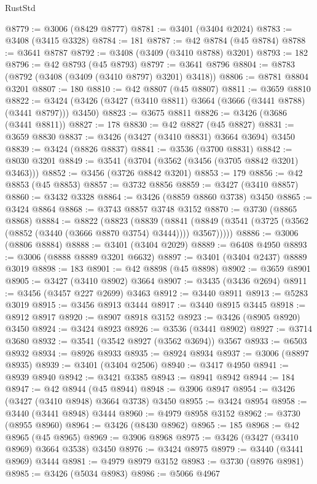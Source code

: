 \begin{lexlean}{RustStd}
\begin{coremodule}
@8779 := @3006 (@8429 @8777)
@8781 := @3401 (@3404 @2024)
@8783 := @3408 (@3415 @3328)
@8784 := 181
@8787 := @42 @8784 (@45 @8784)
@8788 := @3641 @8787
@8792 := @3408 (@3409 (@3410 @8788) @3201)
@8793 := 182
@8796 := @42 @8793 (@45 @8793)
@8797 := @3641 @8796
@8804 := @8783 (@8792 (@3408 (@3409 (@3410 @8797) @3201) @3418))
@8806 := @8781 @8804 @3201
@8807 := 180
@8810 := @42 @8807 (@45 @8807)
@8811 := @3659 @8810
@8822 := @3424 (@3426 (@3427 (@3410 @8811) @3664 (@3666 (@3441 @8788) (@3441 @8797))) @3450)
@8823 := @3675 @8811
@8826 := @3426 (@3686 (@3441 @8811))
@8827 := 178
@8830 := @42 @8827 (@45 @8827)
@8831 := @3659 @8830
@8837 := @3426 (@3427 (@3410 @8831) @3664 @3694) @3450
@8839 := @3424 (@8826 @8837)
@8841 := @3536 (@3700 @8831)
@8842 := @8030 @3201
@8849 := @3541 (@3704 (@3562 (@3456 (@3705 @8842 @3201) @3463)))
@8852 := @3456 (@3726 @8842 @3201)
@8853 := 179
@8856 := @42 @8853 (@45 @8853)
@8857 := @3732 @8856
@8859 := @3427 (@3410 @8857)
@8860 := @3432 @3328
@8864 := @3426 (@8859 @8860 @3738) @3450
@8865 := @3424 @8864
@8868 := @3743 @8857 @3748 @3152
@8870 := @3730 (@8865 @8868)
@8884 := @8822
    (@8823
      (@8839
        (@8841 (@8849 (@3541 (@3725 (@3562 (@8852 (@3440 (@3666 @8870 @3754) @3444)))) @3567)))))
@8886 := @3006 (@8806 @8884)
@8888 := @3401 (@3404 @2029)
@8889 := @6408 @4950
@8893 := @3006 (@8888 @8889 @3201 @6632)
@8897 := @3401 (@3404 @2437) @8889 @3019
@8898 := 183
@8901 := @42 @8898 (@45 @8898)
@8902 := @3659 @8901
@8905 := @3427 (@3410 @8902) @3664
@8907 := @3435 (@3436 @2694)
@8911 := @3456 (@3457 @227 @2699) @3463
@8912 := @3440 @8911
@8913 := @5283 @3019
@8915 := @3456 @8913 @3444
@8917 := @3440 @8915 @3445
@8918 := @8912 @8917
@8920 := @8907 @8918 @3152
@8923 := @3426 (@8905 @8920) @3450
@8924 := @3424 @8923
@8926 := @3536 (@3441 @8902)
@8927 := @3714 @3680
@8932 := @3541 (@3542 @8927 (@3562 @3694)) @3567
@8933 := @6503 @8932
@8934 := @8926 @8933
@8935 := @8924 @8934
@8937 := @3006 (@8897 @8935)
@8939 := @3401 (@3404 @2506)
@8940 := @3417 @4950
@8941 := @8939 @8940
@8942 := @3421 @3385
@8943 := @8941 @8942
@8944 := 184
@8947 := @42 @8944 (@45 @8944)
@8948 := @3906 @8947
@8954 := @3426 (@3427 (@3410 @8948) @3664 @3738) @3450
@8955 := @3424 @8954
@8958 := @3440 (@3441 @8948) @3444
@8960 := @4979 @8958 @3152
@8962 := @3730 (@8955 @8960)
@8964 := @3426 (@8430 @8962)
@8965 := 185
@8968 := @42 @8965 (@45 @8965)
@8969 := @3906 @8968
@8975 := @3426 (@3427 (@3410 @8969) @3664 @3538) @3450
@8976 := @3424 @8975
@8979 := @3440 (@3441 @8969) @3444
@8981 := @4979 @8979 @3152
@8983 := @3730 (@8976 @8981)
@8985 := @3426 (@5034 @8983)
@8986 := @5066 @4967

\end{coremodule}
\end{lexlean}
